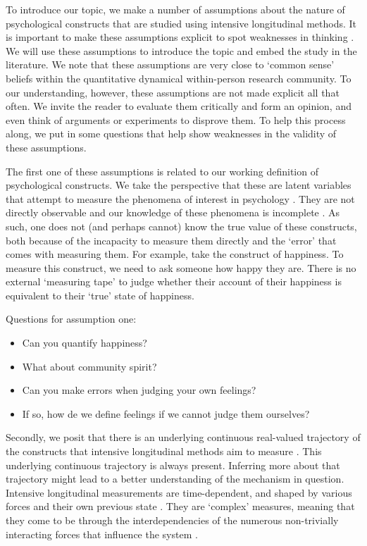 \documentclass[utf8]{FrontiersinVancouver}
\begin{document}
To introduce our topic, we make a number of assumptions about the nature of psychological constructs that are studied using intensive longitudinal methods. It is important to make these assumptions explicit to spot weaknesses in thinking \citep{meehlTheoreticalRisksTabular2004}. We will use these assumptions to introduce the topic and embed the study in the literature. We note that these assumptions are very close to `common sense' beliefs within the quantitative dynamical within-person research community. To our understanding, however, these assumptions are not made explicit all that often. We invite the reader to evaluate them critically and form an opinion, and even think of arguments or experiments to disprove them. To help this process along, we put in some questions that help show weaknesses in the validity of these assumptions. 

The first one of these assumptions is related to our working definition of psychological constructs. We take the perspective that these are latent variables that attempt to measure the phenomena of interest in psychology \citep{borsboomLatentVariableTheory2008}. They are not directly observable and our knowledge of these phenomena is incomplete \citep{friedWhatArePsychological2017, maraunAugustinianMethodologicalFamily2009}. As such, one does not (and perhaps cannot) know the true value of these constructs, both because of the incapacity to measure them directly and the `error' that comes with measuring them. For example, take the construct of happiness. To measure this construct, we need to ask someone how happy they are. There is no external `measuring tape' to judge whether their account of their happiness is equivalent to their `true' state of happiness.

\begin{framed} 
    Questions for assumption one:
    \begin{itemize}
        \item Can you quantify happiness?
        \item What about community spirit?
        \item Can you make errors when judging your own feelings?
        \item If so, how de we define feelings if we cannot judge them ourselves?
    \end{itemize}
\end{framed}

Secondly, we posit that there is an underlying continuous real-valued trajectory of the constructs that intensive longitudinal methods aim to measure \citep{hamakerNoTimePresent2017}. This underlying continuous trajectory is always present. Inferring more about that trajectory might lead to a better understanding of the mechanism in question. Intensive longitudinal measurements are time-dependent, and shaped by various forces and their own previous state \citep{olthofComplexityPsychologicalSelfratings2020b}. They are `complex' measures, meaning that they come to be through the interdependencies of the numerous non-trivially interacting forces that influence the system \citep{olthofComplexityTheoryPsychopathology2023}. 
\end{document}
